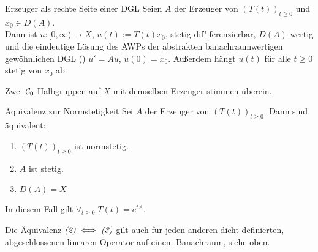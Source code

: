 \linie

\begin{Satz}{Erzeuger als rechte Seite einer DGL}
    Seien $A$ der Erzeuger von $(T(t))_{t \ge 0}$ und $x_0 \in D(A)$.\\
    Dann ist $u\colon [0, \infty) \rightarrow X$, $u(t) := T(t) x_0$,
    stetig dif"|ferenzierbar, $D(A)$-wertig und die eindeutige Lösung des AWPs der
    abstrakten banachraumwertigen gewöhnlichen DGL ()
    $u' = Au$, $u(0) = x_0$.
    Außerdem hängt $u(t)$ für alle $t \ge 0$ stetig von $x_0$ ab.
\end{Satz}

\begin{Kor}
    Zwei $\mathcal{C}_0$-Halbgruppen auf $X$ mit demselben Erzeuger stimmen überein.
\end{Kor}

\linie

\begin{Satz}{Äquivalenz zur Normstetigkeit}
    Sei $A$ der Erzeuger von $(T(t))_{t \ge 0}$.
    Dann sind äquivalent:
    \begin{enumerate}
        \item
        $(T(t))_{t \ge 0}$ ist normstetig.
        
        \item
        $A$ ist stetig.
        
        \item
        $D(A) = X$
    \end{enumerate}
    In diesem Fall gilt $\forall_{t \ge 0}\; T(t) = e^{tA}$.
\end{Satz}

\begin{Bem}
    Die Äquivalenz $\text{\emph{(2)}} \iff \text{\emph{(3)}}$ gilt auch für jeden anderen
    dicht definierten, abgeschlossenen linearen Operator auf einem Banachraum, siehe oben.
\end{Bem}

\pagebreak
